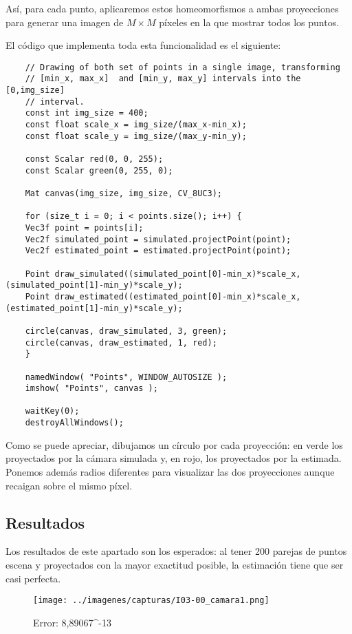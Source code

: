 \documentclass[a4paper, 11pt]{article}
\theoremstyle{definition}
\theoremstyle{theorem}
\begin{document}
    Así, para cada punto, aplicaremos estos homeomorfismos a ambas proyecciones para generar una imagen de $M \times M$ píxeles en la que mostrar todos los puntos.

    El código que implementa toda esta funcionalidad es el siguiente:

    \begin{lstlisting}
    // Drawing of both set of points in a single image, transforming
    // [min_x, max_x]  and [min_y, max_y] intervals into the [0,img_size]
    // interval.
    const int img_size = 400;
    const float scale_x = img_size/(max_x-min_x);
    const float scale_y = img_size/(max_y-min_y);

    const Scalar red(0, 0, 255);
    const Scalar green(0, 255, 0);

    Mat canvas(img_size, img_size, CV_8UC3);

    for (size_t i = 0; i < points.size(); i++) {
    Vec3f point = points[i];
    Vec2f simulated_point = simulated.projectPoint(point);
    Vec2f estimated_point = estimated.projectPoint(point);

    Point draw_simulated((simulated_point[0]-min_x)*scale_x, (simulated_point[1]-min_y)*scale_y);
    Point draw_estimated((estimated_point[0]-min_x)*scale_x, (estimated_point[1]-min_y)*scale_y);

    circle(canvas, draw_simulated, 3, green);
    circle(canvas, draw_estimated, 1, red);
    }

    namedWindow( "Points", WINDOW_AUTOSIZE );
    imshow( "Points", canvas );

    waitKey(0);
    destroyAllWindows();
    \end{lstlisting}

    Como se puede apreciar, dibujamos un círculo por cada proyección: en verde los proyectados por la cámara simulada y, en rojo, los proyectados por la estimada. Ponemos además radios diferentes para visualizar las dos proyecciones aunque recaigan sobre el mismo píxel.

    \subsection{Resultados}
    Los resultados de este apartado son los esperados: al tener 200 parejas de puntos escena y proyectados con la mayor exactitud posible, la estimación tiene que ser casi perfecta.

    \begin{figure}[h!]
        \centering
        \texttt{[image: ../imagenes/capturas/I03-00\_camara1.png]}
        \caption{Error: 8,89067^{-13} \label{camara1}}
    \end{figure}
\end{document}
